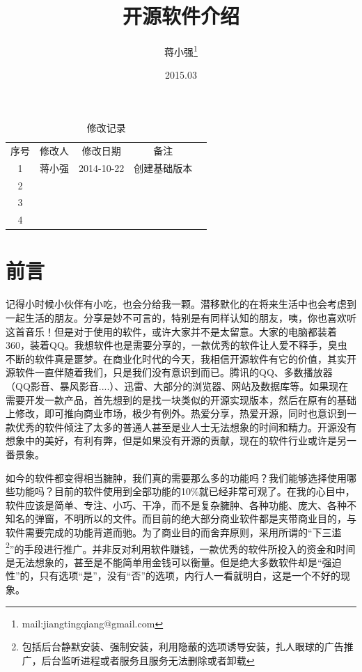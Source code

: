 \documentclass[paper=a4,fontsize=11pt]{article}
\begin{document}
	\title{开源软件介绍}		
	\author{蒋小强\footnote{mail:jiangtingqiang@gmail.com}}
	\date{2015.03}	
	
	\maketitle %
	\clearpage
	
	\begin{table}\caption{修改记录}					
		\medskip
		\centering		
		\begin{tabular}{|c|c|c|c|c|}
			\hline
			\multirow{1}{*}{序号}
			& \multicolumn{1}{|c|}{修改人}  
			& \multicolumn{1}{|c|}{修改日期} 
			& \multicolumn{1}{|c|}{备注}\\			
			\cline{1-4}
			1 & 蒋小强 & 2014-10-22 & 创建基础版本\\
			\hline
			2 & & &\\
			\hline
			3 & & &\\
			\hline
			4 & & &\\
			\hline
		\end{tabular}
	\end{table}
	\clearpage
	\section{前言}
	
	记得小时候小伙伴有小吃，也会分给我一颗。潜移默化的在将来生活中也会考虑到一起生活的朋友。分享是妙不可言的，特别是有同样认知的朋友，咦，你也喜欢听这首音乐！但是对于使用的软件，或许大家并不是太留意。大家的电脑都装着360，装着QQ。我想软件也是需要分享的，一款优秀的软件让人爱不释手，臭虫不断的软件真是噩梦。在商业化时代的今天，我相信开源软件有它的价值，其实开源软件一直伴随着我们，只是我们没有意识到而已。腾讯的QQ、多数播放器（QQ影音、暴风影音....）、迅雷、大部分的浏览器、网站及数据库等。如果现在需要开发一款产品，首先想到的是找一块类似的开源实现版本，然后在原有的基础上修改，即可推向商业市场，极少有例外。热爱分享，热爱开源，同时也意识到一款优秀的软件倾注了太多的普通人甚至是业人士无法想象的时间和精力。开源没有想象中的美好，有利有弊，但是如果没有开源的贡献，现在的软件行业或许是另一番景象。	
	
	如今的软件都变得相当臃肿，我们真的需要那么多的功能吗？我们能够选择使用哪些功能吗？目前的软件使用到全部功能的10\%就已经非常可观了。在我的心目中，软件应该是简单、专注、小巧、干净，而不是复杂臃肿、各种功能、庞大、各种不知名的弹窗，不明所以的文件。而目前的绝大部分商业软件都是夹带商业目的，与软件需要完成的功能背道而驰。为了商业目的而舍弃原则，采用所谓的“下三滥\footnote{包括后台静默安装、强制安装，利用隐蔽的选项诱导安装，扎人眼球的广告推广，后台监听进程或者服务且服务无法删除或者卸载}”的手段进行推广。并非反对利用软件赚钱，一款优秀的软件所投入的资金和时间是无法想象的，甚至是不能简单用金钱可以衡量。但是绝大多数软件却是“强迫性”的，只有选项“是”，没有“否”的选项，内行人一看就明白，这是一个不好的现象。
	
\end{document}
